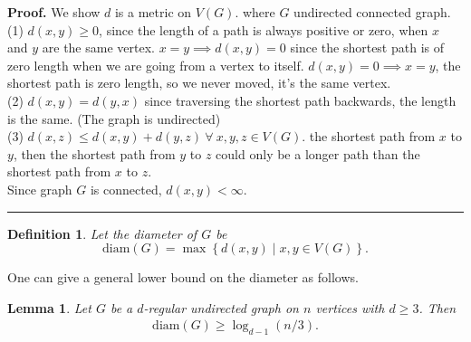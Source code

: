\documentclass[12pt]{article}%
\newtheorem{definition}[theorem]{Definition}
\newtheorem{lemma}[theorem]{Lemma}
\newenvironment{proof}[1][Proof]{\textbf{#1.} }{\ \rule{0.5em}{0.5em}}
\begin{document}
\begin{proof}
    We show $d$ is a metric on $V(G)$. 
    where $G$ undirected connected graph.\\
    (1) $d (x,y) \geq 0$, since the length of a path is always positive or zero,
    when $x$ and $y$ are the same vertex. 
    $x=y \implies d(x,y)=0$ since the shortest path is of zero length
    when we are going from a vertex to itself.
    $d(x,y)=0 \implies x=y$, the shortest path is zero length, so we 
    never moved, it's the same vertex.\\
    (2) $d(x,y) = d(y,x)$ since traversing the shortest path backwards,
    the length is the same. (The graph is undirected)\\
    (3) $d(x,z) \leq d(x,y) + d(y,z) \ \forall \ x,y,z \in V(G)$. the 
    shortest path from $x$ to $y$, then the shortest path from 
    $y$ to $z$ could only be a longer path than the shortest path
    from $x$ to $z$.\\
    Since graph $G$ is connected, $d(x,y) < \infty$.
\end{proof}


\begin{definition}
Let the \emph{diameter} of $G$ be 
\begin{equation*}
\mathrm{diam}(G)=\max \left\{ d(x,y)\mid x,y\in V(G)\right\} .
\end{equation*}
\end{definition}

One can give a general lower bound on the diameter as follows.

\begin{lemma}
Let $G$ be a $d$-regular undirected graph on $n$ vertices with $d\geq 3$.
Then 
\begin{align}
\mathrm{diam}(G)\geq \log _{d-1}(n/3).
\end{align}
\end{lemma}
\end{document}
